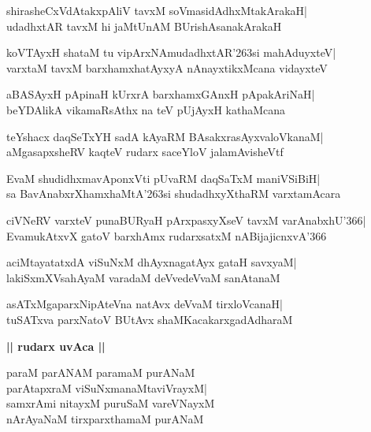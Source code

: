 \documentclass[twoside,12pt,openright]{book}
\def\S{\char'263}
\newcounter{shloka}[chapter]
\def\uvaca#1{\centerline{{\large\textbf{#1}}}}
\begin{document}
\begin{shloka}%
shirasheCxVdAtakxpAliV tavxM soVmasidAdhxMtakArakaH|\\
udadhxtAR tavxM hi jaMtUnAM BUrishAsanakArakaH
\end{shloka}

\begin{shloka}%
koVTAyxH shataM tu vipArxNAmudadhxtAR\S si mahAduyxteV|\\
varxtaM tavxM barxhamxhatAyxyA nAnayxtikxMcana vidayxteV
\end{shloka}

\begin{shloka}%
aBASAyxH pApinaH kUrxrA barxhamxGAnxH pApakAriNaH|\\
beYDAlikA vikamaRsAthx na teV pUjAyxH kathaMcana
\end{shloka}

\begin{shloka}%
teYshacx daqSeTxYH sadA kAyaRM BAsakxrasAyxvaloVkanaM|\\
aMgasapxsheRV kaqteV rudarx saceYloV jalamAvisheVtf
\end{shloka}

\begin{shloka}%
EvaM shudidhxmavAponxVti pUvaRM daqSaTxM maniVSiBiH|\\
sa BavAnabxrXhamxhaMtA\S si shudadhxyXthaRM varxtamAcara
\end{shloka}

\begin{shloka}%
ciVNeRV varxteV punaBURyaH pArxpasxyXseV tavxM varAnabxhU\char'366|\\
EvamukAtxvX gatoV barxhAmx rudarxsatxM nABijajicnxvA\char'366
\end{shloka}

\begin{shloka}%
aciMtayatatxdA viSuNxM dhAyxnagatAyx gataH savxyaM|\\
lakiSxmXVsahAyaM varadaM deVvedeVvaM sanAtanaM
\end{shloka}

\begin{shloka}%
asATxMgaparxNipAteVna natAvx deVvaM tirxloVcanaH|\\
tuSATxva parxNatoV BUtAvx shaMKacakarxgadAdharaM
\end{shloka}

\uvaca{|| rudarx uvAca ||}
\begin{shloka}%
paraM parANAM paramaM purANaM\\
parAtapxraM viSuNxmanaMtaviVrayxM|\\
samxrAmi nitayxM puruSaM vareVNayxM\\
nArAyaNaM tirxparxthamaM purANaM
\end{shloka}
\end{document}
